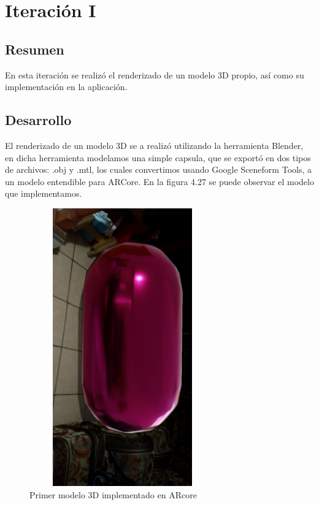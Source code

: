 \section{Iteración I}
\subsection{Resumen}
En esta iteración se realizó el renderizado de un modelo 3D propio, así como su implementación en la aplicación.
\subsection{Desarrollo}
El renderizado de un modelo 3D se a realizó utilizando la herramienta Blender, en dicha herramienta modelamos una simple capsula, que se exportó en dos tipos de archivos: .obj y .mtl, los cuales convertimos usando Google Sceneform Tools, a un modelo entendible para ARCore. En la figura 4.27 se puede observar el modelo que implementamos.
\begin{figure}[H]
	\centering
	\includegraphics[width=8cm,height=12cm]{imagenes/iteraciones/AR2.png}
	\caption{Primer modelo 3D implementado en ARcore}
	\label{fig:1modelo}
\end{figure} 
\clearpage